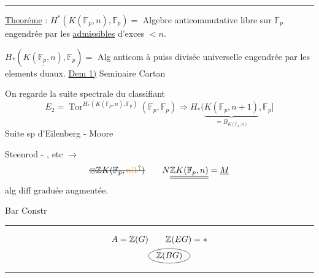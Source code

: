 \begin{center}\rule{1.8cm}{0.3pt}\end{center}
\uline{Theoréme} : 
$H^{*}(K(\mathbb F_p,n),\mathbb F_p)={}$ Algebre anticommutative libre sur $\mathbb F_p$ engendrée par les \uline{ admissibles} d'exces $<n$.

$H_{*}(\underline{K(\mathbb F_p,n)},\mathbb F_p)={}$ Alg anticom à puiss divisée universelle engendrée par les elements duaux.
\uline{Dem 1)} Seminaire Cartan

On regarde la suite spectrale du classifiant
\[
E_2=\operatorname{Tor}^{H_{*}(K(\mathbb F_p,n),\mathbb F_p)}
(\mathbb F_p,\mathbb F_p)\Longrightarrow H_{*}(\underbrace{K(\mathbb F_p,n+1)}_{\displaystyle =B_{K(\mathbb F_p,n)}},\mathbb F_p]
\]
Suite sp d'Eilenberg - Moore

Steenrod - , etc $\longrightarrow$
\[
\deleted{\otimes\mathbb Z K(\mathbb F_p,\unsure{n|1})}
\qquad N\underline{\underline{\mathbb Z K(\mathbb F_p,n)}}=\underline M
\]
alg diff graduée augmentée.

Bar Constr
\begin{center}\rule{2.2cm}{0.3pt}\end{center}
\[
\begin{aligned}
A=\mathbb Z(G)&\qquad\mathbb Z(EG)=*\\
&\tikz[baseline=(a.base)]{\node(a){$\mathbb Z(BG)$};\draw(a.center) ellipse (.85cm and .30cm);}
\end{aligned}
\]
\begin{center}\rule{3cm}{0.3pt}\end{center}

